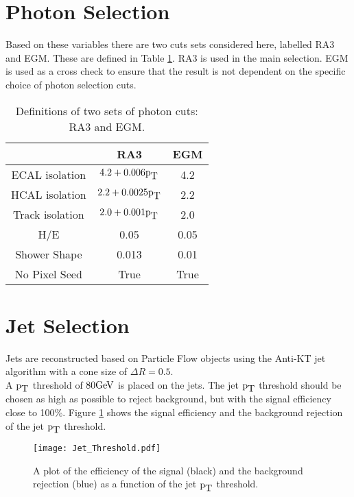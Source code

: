 \section{Photon Selection}


Based on these variables there are two cuts sets considered here, labelled  RA3
and EGM. These are defined in Table \ref{tab:photoncuts}. RA3 is used in the 
main selection. EGM is used as a cross check to ensure that the result is not 
dependent on the specific choice of photon selection cuts.

\begin{table}
\begin{center}
\begin{tabular}{|c|c|c|}
\hline
 & RA3 & EGM \\
\hline
ECAL isolation & $4.2 + 0.006\mbox{p}_{\mbox{T}}$ & 4.2 \\
\hline
HCAL isolation & $2.2 + 0.0025\mbox{p}_{\mbox{T}}$ & 2.2 \\
\hline
Track isolation & $2.0 + 0.001\mbox{p}_{\mbox{T}}$ & 2.0 \\
\hline
H/E & 0.05 & 0.05 \\
\hline
Shower Shape & 0.013 & 0.01 \\
\hline
No Pixel Seed & True & True \\
\hline
\end{tabular}
\end{center}
\caption{Definitions of two sets of photon cuts: RA3 and EGM.}
\label{tab:photoncuts}
\end{table}

\section{Jet Selection}

Jets are reconstructed based on Particle Flow objects \cite{pf} using the 
Anti-KT jet algorithm with a cone size of $\Delta R = 0.5$. \\

A $\mbox{p}_{\mbox{T}}$ threshold of $80 \mbox{GeV}$ is placed on the jets. The jet $\mbox{p}_{\mbox{T}}$ threshold 
should be chosen as high as possible to reject background, but with the signal 
efficiency close to 100\%. Figure \ref{fig:Jet_Threshold} shows the signal 
efficiency and the background rejection of the jet $\mbox{p}_{\mbox{T}}$ threshold. 

\begin{figure}
\begin{center}
\texttt{[image: Jet\_Threshold.pdf]}
\end{center}
\caption{A plot of the efficiency of the signal (black) and the background
rejection (blue) as a function of the jet $\mbox{p}_{\mbox{T}}$ threshold.}
\label{fig:Jet_Threshold}
\end{figure}

